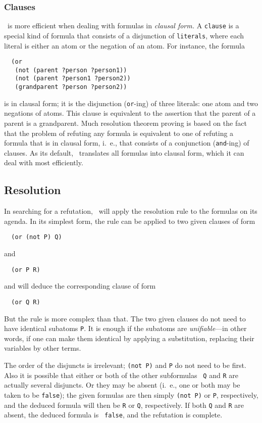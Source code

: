 \subsubsection{Clauses}
\Snark\  is more efficient
when dealing with formulas in {\em clausal form.}
A {\tt clause} is a special kind of formula that consists of a
disjunction of {\tt literals}, where each literal is either an atom or
the negation of an atom.  For instance, the formula
\begin{verbatim}
  (or
   (not (parent ?person ?person1))
   (not (parent ?person1 ?person2))
   (grandparent ?person ?person2))
\end{verbatim}
is in clausal form; it is the disjunction ({\tt or}-ing) of three literals:
one atom and two negations of atoms.  This clause is equivalent to the
assertion that the parent of a parent is a grandparent.  Much resolution
theorem proving is based on the fact that the problem of refuting any formula
is equivalent to one of refuting a formula that is in clausal form, i.\ e.,
that consists of a conjunction ({\tt and}-ing) of clauses.  As its default,
\snark\  translates all formulas into clausal form, which it can deal with
most efficiently.

\subsection{Resolution}
\label{subsec-resolution}

In searching for a refutation, \snark\  will apply the resolution rule
to the formulas on its agenda.  In its simplest form, the rule can be
applied to two given clauses of form
\begin{verbatim}
  (or (not P) Q)
\end{verbatim}
and
\begin{verbatim}
  (or P R)
\end{verbatim}
and will deduce the corresponding clause of form
\begin{verbatim}
  (or Q R)
\end{verbatim}
But the rule is more complex than that.  The two given clauses do not
need to have identical subatoms {\tt P}. It is enough if the
subatoms are {\em unifiable}---in other words, if one can make them
identical by applying a substitution, replacing their
variables by other terms.

The order of the disjuncts is irrelevant; \verb'(not P)' and {\tt P}
do not need to be first.
Also it is possible that either or both of the other subformulas {\tt
Q} and {\tt R} are actually several disjuncts.  Or they may be absent
(i.\ e., one or both may be taken to be {\tt false}); the given formulas
are then simply {\tt (not P)} or {\tt P}, respectively, and the
deduced formula will then be {\tt R} or {\tt Q}, respectively.  If
both {\tt Q} and {\tt R} are absent, the deduced formula is {\tt
false}, and the refutation is complete.

